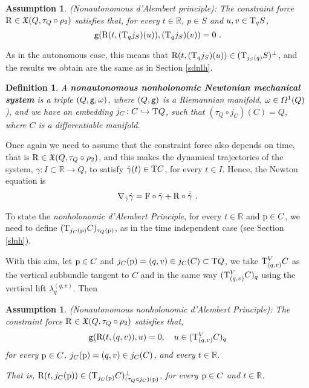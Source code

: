 \documentclass[12pt]{report}
\newtheorem{definition}[teor]{Definition}
\newtheorem{assump}[teor]{Assumption}
\def\vf{\mathfrak X}
\def\df{{\mit\Omega}}
\def\Real{\mathbb{R}}
\def\Tan{{\rm T}}
\begin{document}
\begin{assump}
{\rm (Nonautonomous d'Alembert principle)}:
The constraint force ${\rm R}\in\vf (Q,\tau_Q\circ\rho_2)$ satisfies that,
for every $t\in\Real$, $p\in S$ and $u,v\in\Tan_qS$,
$$
{\tt g}({\rm R}(t,(\Tan_qj_S)(u)),(\Tan_qj_S)(v))=0 \ .
$$
\end{assump}

As in the autonomous case, this means that 
${\rm R}(t,(\Tan_qj_S)(u))\in(\Tan_{j_S(q)}S)^\perp$, and the results we obtain are the same as in Section \ref{sdnlh}.

\begin{definition}
A {\sl \textbf{nonautonomous nonholonomic Newtonian mechanical system}}
is a triple $(Q,{\tt g},\omega)$, where $(Q,{\tt g})$ is a Riemannian manifold, $\omega\in\df^1(Q)$),
and we have an embedding 
$j_C\colon C\hookrightarrow \Tan Q$, such that $(\tau_Q\circ j_C)(C)=Q$,
 where $C$ is a differentiable manifold.
\end{definition}

Once again we need to assume that the constraint force also depends on time, that is ${\rm R}\in\vf (Q,\tau_Q\circ\rho_2)$, and this makes the dynamical trajectories of the system, 
$\gamma\colon I\subset\Real\to Q$, to satisfy
$\dot\gamma(t)\in\Tan C$,  for every $t\in I$.
Hence, the Newton equation is 
$$
\nabla_{\dot\gamma}\dot\gamma ={\rm F}\circ\bar\gamma +{\rm R}\circ\bar{\dot\gamma} \ .
$$

To state the \textsl{nonholonomic d'Alembert Principle}, for every $t\in\Real$
and ${\rm p}\in C$, we need to define $(\Tan_{j_C({\rm p})}C)_{\tau_
Q({\rm p})}$,
as in the time independent case (see Section \ref{slnh}).

With this aim, let ${\rm p}\in C$ and $j_C({\rm p})=(q,v)\in j_C(C)\subset\Tan Q$, we take $\Tan^V_{(q,v)}C$ as the vertical subbundle tangent to $C$ and in the same way  $(\Tan^V_{(q,v)}C)_q$ using the vertical lift $\lambda_{q}^{(q,v)}$. Then

\begin{assump}
{\rm (Nonautonomous nonholonomic d'Alembert Principle)}:
The constraint force ${\rm R}\in\vf (Q,\tau_Q\circ\rho_2)$ satisfies that,
$$
{\tt g}({\rm R}(t,(q,v)),u)=0 ,\quad u\in(\Tan^V_{(q,v)}C)_q
$$
for every  ${\rm p}\in C$, $j_C({\rm p})=(q,v)\in j_C(C)$, and every $t\in\Real$. 

That is,
${\rm R}(t,j_C({\rm p}))\in(\Tan_{j_C({\rm p})}C)_{(\tau_Q \circ j_C)({\rm p})}^\perp $,
for every ${\rm p}\in C$ and $t\in\Real$.
\end{assump}
\end{document}
